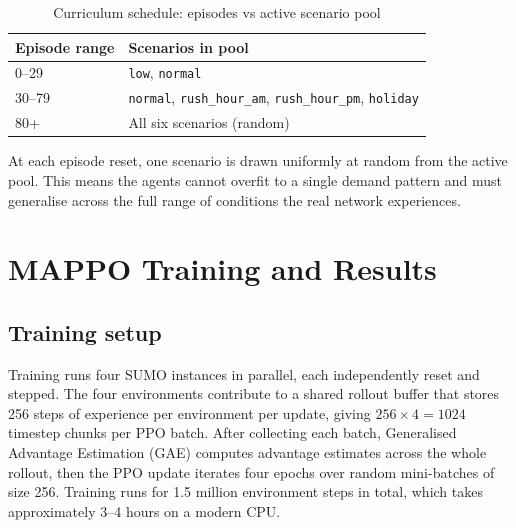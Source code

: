 \documentclass[11pt, a4paper]{report}
\begin{document}
\begin{table}[H]
\centering
\caption{Curriculum schedule: episodes vs active scenario pool}
\label{tab:curriculum}
\begin{tabular}{ll}
\toprule
\textbf{Episode range} & \textbf{Scenarios in pool} \\
\midrule
0--29 & \texttt{low}, \texttt{normal} \\
30--79 & \texttt{normal}, \texttt{rush\_hour\_am}, \texttt{rush\_hour\_pm}, \texttt{holiday} \\
80+ & All six scenarios (random) \\
\bottomrule
\end{tabular}
\end{table}

At each episode reset, one scenario is drawn uniformly at random from the active pool. This means the agents cannot overfit to a single demand pattern and must generalise across the full range of conditions the real network experiences.

\chapter{MAPPO Training and Results}
\label{chap:mappo_results}

\section{Training setup}

Training runs four SUMO instances in parallel, each independently reset and stepped. The four environments contribute to a shared rollout buffer that stores 256 steps of experience per environment per update, giving $256 \times 4 = 1024$ timestep chunks per PPO batch. After collecting each batch, Generalised Advantage Estimation (GAE) computes advantage estimates across the whole rollout, then the PPO update iterates four epochs over random mini-batches of size 256. Training runs for 1.5 million environment steps in total, which takes approximately 3--4 hours on a modern CPU.
\end{document}
